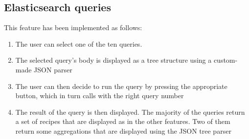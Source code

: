 \subsection*{Elasticsearch queries}
This feature has been implemented as follows:

\begin{enumerate}
    \item The user can select one of the ten queries.
    \item The selected query's body is displayed as a tree structure using a custom-made JSON parser
    \item The user can then decide to run the query by pressing the appropriate button, which in turn calls  with the right query number
    \item The result of the query is then displayed. The majority of the queries return a set of recipes that are displayed as in the other features. Two of them return some aggregations that are displayed using the JSON tree parser
\end{enumerate}